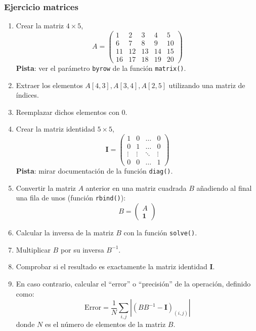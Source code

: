 \documentclass{beamer}
\begin{document}
\begin{frame}[allowframebreaks]
\frametitle{Ejercicio matrices}
\begin{enumerate}
\item Crear la matriz $4 \times 5$, $$A = \begin{pmatrix} 1 & 2 & 3 & 4 & 5 \\ 6 & 7 & 8 & 9 & 10 \\ 11 & 12 & 13 & 14 & 15 \\ 16 & 17 & 18 & 19 & 20 \end{pmatrix}$$ \textbf{Pista}: ver el parámetro \texttt{byrow} de la función \texttt{matrix()}.

\item Extraer los elementos $A[4,3], A[3,4], A[2,5]$ utilizando una matriz de índices.

\item Reemplazar dichos elementos con $0$.
\framebreak
\item Crear la matriz identidad $5 \times 5$, $$\mathbf{I} = \begin{pmatrix} 1 & 0 & \dots & 0 \\ 0 & 1 & \dots & 0 \\ \vdots & \vdots & \ddots & \vdots \\ 0 & 0 & \dots & 1 \end{pmatrix}$$ \textbf{Pista}: mirar documentación de la función \texttt{diag()}.
\item Convertir la matriz $A$ anterior en una matriz cuadrada $B$ añadiendo al final una fila de unos (función \texttt{rbind()}): $$B = \begin{pmatrix} A \\ \mathbf{1} \end{pmatrix}$$
\item Calcular la inversa de la matriz $B$ con la función \texttt{solve()}.
\framebreak
\item Multiplicar $B$ por su inversa $B^{-1}$.
\item Comprobar si el resultado es exactamente la matriz identidad $\mathbf{I}$.
\item En caso contrario, calcular el ``error'' o ``precisión'' de la operación, definido como: $$\text{Error} = \frac{1}{N}\sum_{i,j}{|(BB^{-1} - \mathbf{I})_{(i,j)}|}$$ donde $N$ es el número de elementos de la matriz $B$.
\end{enumerate}
\end{frame}
\end{document}
